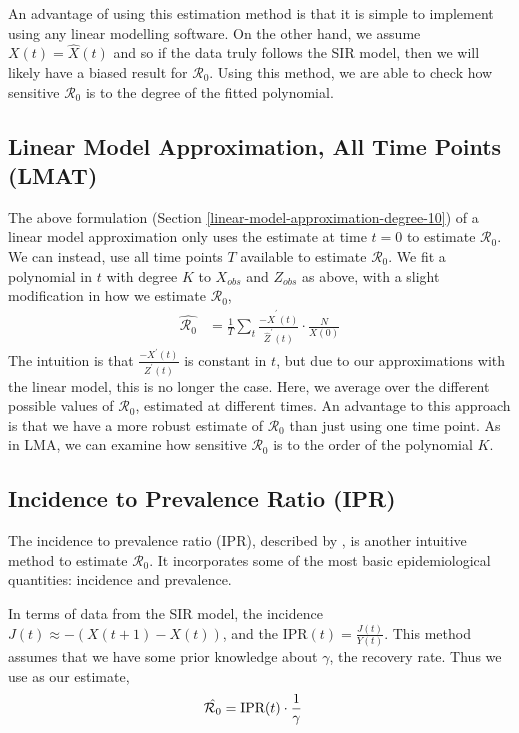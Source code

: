 \documentclass[12pt]{article}
\newcommand{\rr}{\ensuremath{\mathcal{R}_0}}
\begin{document}
  An advantage of using this estimation method is that it is simple to implement using any linear modelling software.  On the other hand, we assume $X(t) = \hat{X}(t)$ and so if the data truly follows the SIR model, then we will likely have a biased result for $\rr$.  Using this method, we are able to check how sensitive $\rr$ is to the degree of the fitted polynomial.

\subsection{Linear Model Approximation, All Time Points (LMAT)}\label{linear-model-approximation-all-time-points-degree-10}

The above formulation (Section \ref{linear-model-approximation-degree-10}) of a linear model approximation only uses the estimate at time $t=0$ to estimate $\rr$.  We can instead, use all time points $T$ available to estimate $\rr$.  We fit a polynomial in \(t\) with degree \(K\) to \(X_{obs}\)
and \(Z_{obs}\) as above, with a slight modification in how we estimate
\(\rr\),
\begin{align*}
  \hat{\rr} &= \frac{1}{T} \sum_t \frac{-\hat{X}^\prime(t)}{\hat{Z}^\prime(t)} \cdot \frac{N}{X(0)} 
\end{align*}
The intuition is that $\frac{-X^\prime(t)}{Z^\prime(t)}$ is constant in $t$, but due to our approximations with the linear model, this is no longer the case.  Here, we average over the different possible values of $\rr$, estimated at different times.  An advantage to this approach is that we have a more robust estimate of $\rr$ than just using one time point.  As in LMA, we can examine how sensitive $\rr$ is to the order of the polynomial $K$.


\subsection{Incidence to Prevalence Ratio (IPR)}\label{incidence-to-prevalence-ratio}
The incidence to prevalence ratio (IPR), described by \cite{Nishiura2009}, is another intuitive method to estimate $\rr$.  It incorporates some of the most basic epidemiological quantities: incidence and prevalence.

In terms of data from the SIR model, the incidence $J(t) \approx -(X(t+1) - X(t))$, and the IPR$(t) = \frac{J(t)}{Y(t)}$.  This method assumes that we have some prior knowledge about $\gamma$, the recovery rate.  Thus we use as our estimate,
\begin{align*}
\hat{\rr} &= \textnormal{IPR}(t) \cdot \frac{1}{\gamma}
\end{align*}
\end{document}
